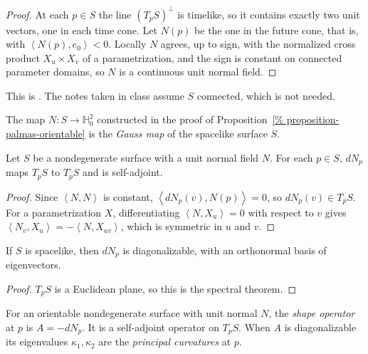 \begin{proof}
At each $p\in S$ the line $(T_pS)^{\perp}$
is timelike, so it contains exactly two
unit vectors, one in each time cone. Let
$N(p)$ be the one in the future cone, that
is, with
$\left\langle{} N(p),e_0 \right\rangle{}<0$.
Locally $N$ agrees, up to sign, with the
normalized cross product $X_u\times X_v$ of
a parametrization, and the sign is constant
on connected parameter domains, so $N$ is a
continuous unit normal field.
\end{proof}

This is \cite[Theorem
3.1]{lopez2014differential}. The notes
taken in class assume $S$ connected, which
is not needed.

\begin{definition}
\label{definition-palmas-gauss-map}
The map $N\colon S\to\mathbb{H}^2_0$
constructed in the proof of
Proposition~\ref{%
proposition-palmas-orientable}
is the \emph{Gauss map} of the spacelike
surface $S$.
\end{definition}

\begin{lemma}
\label{lemma-palmas-dn-self-adjoint}
Let $S$ be a nondegenerate surface with a
unit normal field $N$. For each $p\in S$,
$dN_p$ maps $T_pS$ to $T_pS$ and is
self-adjoint.
\end{lemma}

\begin{proof}
Since
$\left\langle{} N,N \right\rangle{}$ is
constant,
$\left\langle{} dN_p(v),N(p)
\right\rangle{}=0$, so $dN_p(v)\in T_pS$.
For a parametrization $X$, differentiating
$\left\langle{} N,X_u \right\rangle{}=0$
with respect to $v$ gives
$\left\langle{} N_v,X_u \right\rangle{}
=-\left\langle{} N,X_{uv} \right\rangle{}$,
which is symmetric in $u$ and $v$.
\end{proof}

\begin{corollary}
\label{corollary-palmas-dn-diagonalizable}
If $S$ is spacelike, then $dN_p$ is
diagonalizable, with an orthonormal basis
of eigenvectors.
\end{corollary}

\begin{proof}
$T_pS$ is a Euclidean plane, so this is the
spectral theorem.
\end{proof}

\begin{definition}
\label{definition-palmas-shape-operator}
For an orientable nondegenerate surface
with unit normal $N$, the \emph{shape
operator} at $p$ is $A=-dN_p$. It is a
self-adjoint operator on $T_pS$. When $A$
is diagonalizable its eigenvalues
$\kappa_1,\kappa_2$ are the
\emph{principal curvatures} at $p$.
\end{definition}

